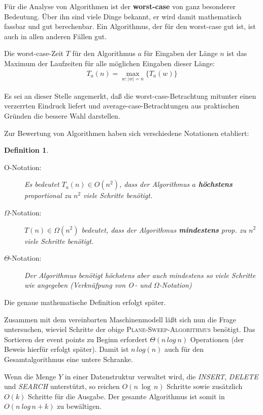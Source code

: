 \documentclass{scrreprt}%
\theoremstyle{break}
\newtheorem{definition}{Definition}
\begin{document}
Für die Analyse von Algorithmen ist der \textbf{worst-case} von ganz
besonderer Bedeutung. Über ihn sind viele Dinge bekannt, er wird
damit mathematisch fassbar und gut berechenbar. Ein Algorithmus,
der für den worst-case gut ist, ist auch in allen anderen Fällen gut.

Die worst-case-Zeit $T$ für den Algorithmus $a$ für Eingaben der Länge $n$
ist das Maximum der Laufzeiten für alle möglichen Eingaben dieser
Länge:
\begin{gather*}
  T_a(n) = \max_{w:|w|=n}\big\{T_a(w)\big\}
\end{gather*}

Es sei an dieser Stelle angemerkt, daß die worst-case-Betrachtung mitunter
einen verzerrten Eindruck liefert und average-case-Betrachtungen aus
praktischen Gründen die bessere Wahl darstellen.

Zur Bewertung von Algorithmen haben sich verschiedene Notationen
etabliert:
\begin{definition}
  \begin{description}
   \item[O-Notation:]
    Es bedeutet $T_a(n) \in O(n^2)$, dass der Algorithmus $a$
    \textbf{höchstens} proportional zu $n^2$ viele Schritte benötigt. 
   \item[$\Omega$-Notation:]
    $T(n) \in \Omega (n^2)$ bedeutet, dass der Algorithmus \textbf{mindestens}
    prop. zu $n^2$ viele Schritte benötigt. 
   \item[$\Theta$-Notation:]
    Der Algorithmus benötigt höchstens aber auch mindestens so viele
    Schritte wie angegeben (Verknüfpung von O$\,$- und $\Omega$-Notation)
  \end{description}
\end{definition}
Die genaue mathematische Definition erfolgt später.

Zusammen mit dem vereinbarten
Maschinenmodell läßt sich nun die Frage untersuchen, wieviel Schritte
der obige \textsc{Plane-Sweep-Algorithmus} benötigt.
Das Sortieren der event points zu Beginn erfordert $\Theta(n\, log~n)$
Operationen (der Beweis hierfür erfolgt später). Damit ist $n\,log(n)$
auch für den Gesamtalgorithmus eine untere Schranke.

Wenn die Menge $Y$ in einer Datenstruktur verwaltet wird, die 
\textit{INSERT}, \textit{DELETE} und \textit{SEARCH} unterstützt, so
reichen $O(n\: \log\,n)$ Schritte sowie zusätzlich $O(k)$ Schritte für
die Ausgabe. Der gesamte Algorithmus ist somit in $O(n\:log\,n+k)$ zu
bewältigen.
\end{document}
